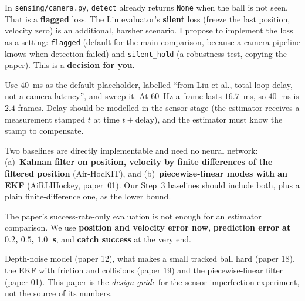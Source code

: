 \documentclass[11pt,a4paper]{article}
\begin{document}
\begin{ours}
In \texttt{sensing/camera.py}, \texttt{detect} already returns \texttt{None} when the ball is not
seen. That is a \textbf{flagged} loss. The Liu evaluator's \textbf{silent} loss (freeze the last
position, velocity zero) is an additional, harsher scenario. I propose to implement the loss as a
setting: \texttt{flagged} (default for the main comparison, because a camera pipeline knows when
detection failed) and \texttt{silent\_hold} (a robustness test, copying the paper). This is a
\textbf{decision for you}.
\end{ours}

\begin{ours}
Use $40$~ms as the default placeholder, labelled ``from Liu et al., total loop delay, not a
camera latency'', and sweep it. At $60$~Hz a frame lasts $16.7$~ms, so $40$~ms is $2.4$ frames.
Delay should be modelled in the sensor stage (the estimator receives a measurement stamped $t$ at
time $t+\text{delay}$), and the estimator must know the stamp to compensate.
\end{ours}

\begin{ours}
Two baselines are directly implementable and need no neural network: (a)~\textbf{Kalman filter on
position, velocity by finite differences of the filtered position} (Air-HocKIT), and
(b)~\textbf{piecewise-linear modes with an EKF} (AiRLIHockey, paper~01). Our Step~3 baselines
should include both, plus a plain finite-difference one, as the lower bound.
\end{ours}

\begin{ours}
The paper's success-rate-only evaluation is not enough for an estimator comparison. We use
\textbf{position and velocity error now}, \textbf{prediction error at $0.2$, $0.5$, $1.0$~s}, and
\textbf{catch success} at the very end.
\end{ours}

\begin{eqbox}
Depth-noise model (paper 12), what makes a small tracked ball hard (paper 18), the EKF with
friction and collisions (paper 19) and the piecewise-linear filter (paper 01). This paper is
the \emph{design guide} for the sensor-imperfection experiment, not the source of its numbers.
\end{eqbox}
\end{document}

